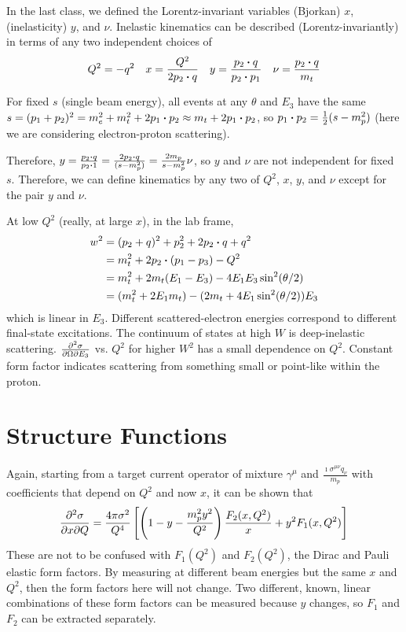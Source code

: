 \documentclass[a4paper,twoside,master.tex]{subfiles}
\begin{document}

In the last class, we defined the Lorentz-invariant variables (Bjorkan) $ x $, (inelasticity) $ y $, and $ \nu $. Inelastic kinematics can be described (Lorentz-invariantly) in terms of any two independent choices of
\begin{equation}
    Q^2 = -q^2 \quad x = \frac{Q^2}{2p_2 \vdot q} \quad y = \frac{p_2 \vdot q}{p_2 \vdot p_1} \quad \nu = \frac{p_2 \vdot q}{m_t}
\end{equation}

For fixed $ s $ (single beam energy), all events at any $ \theta $ and $ E_3 $ have the same $ s = (p_1 + p_2)^2 = m_e^2 + m_t^2 + 2p_1 \vdot p_2 \approx m_t + 2 p_1 \vdot p_2 $, so $ p_1 \vdot p_2 = \frac{1}{2} (s - m_p^2) $ (here we are considering electron-proton scattering).

Therefore, $ y = \frac{p_2 \vdot q}{p_2 \vdot 1} = \frac{2p_2 \vdot q}{(s - m_p^2)} = \frac{2 m_p}{s-m_p^2} \nu $, so $ y $ and $ \nu $ are not independent for fixed $ s $. Therefore, we can define kinematics by any two of $ Q^2 $, $ x $, $ y $, and $ \nu $ except for the pair $ y $ and $ \nu $.

At low $ Q^2 $ (really, at large $ x $), in the lab frame,
\begin{align}
    w^2 &= (p_2 + q)^2 + p_2^2 + 2 p_2 \vdot q + q^2 \\
        &= m_t^2 + 2p_2 \vdot (p_1 - p_3) - Q^2 \\
        &= m_t^2 + 2m_t (E_1 - E_3) - 4 E_1 E_3 \sin[2](\theta / 2) \\
        &= (m_t^2 + 2 E_1 m_t) - (2m_t + 4E_1 \sin[2](\theta / 2)) E_3
\end{align}
which is linear in $ E_3 $. Different scattered-electron energies correspond to different final-state excitations. The continuum of states at high $ W $ is deep-inelastic scattering. $ \pdv{\sigma}{\Omega}{E_3} $ vs. $ Q^2 $ for higher $ W^2 $ has a small dependence on $ Q^2 $. Constant form factor indicates scattering from something small or point-like within the proton.

\section{Structure Functions}\label{sec:structure_functions}

Again, starting from a target current operator of mixture $ \gamma^{\mu} $ and $ \frac{\imath \sigma^{\mu \nu} q_{\nu}}{m_p} $ with coefficients that depend on $ Q^2 $ and now $ x $, it can be shown that
\begin{equation}
    \pdv{\sigma}{x}{Q} = \frac{4 \pi \sigma^2}{Q^4}\left[ \left( 1 - y - \frac{m_p^2 y^2}{Q^2} \right) \frac{F_2(x,Q^2)}{x} + y^2 F_1(x,Q^2) \right]
\end{equation}
These are not to be confused with $ F_1(Q^2) $ and $ F_2(Q^2) $, the Dirac and Pauli elastic form factors. By measuring at different beam energies but the same $ x $ and $ Q^2 $, then the form factors here will not change. Two different, known, linear combinations of these form factors can be measured because $ y $ changes, so $ F_1 $ and $ F_2 $ can be extracted separately.
\end{document}

